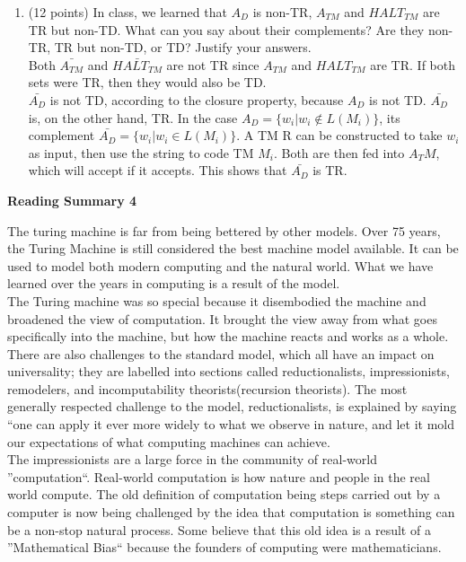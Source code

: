 \documentclass[11pt]{article}
\begin{document}
\begin{enumerate}
  \item (12 points) In class, we learned that $A_D$ is non-TR, $A_{TM}$ and $HALT_{TM}$ are TR but non-TD. What can you say 
	about their complements? Are they non-TR, TR but non-TD, or TD? Justify your answers. \\
	
	Both $\bar{A_{TM}}$ and $\bar{HALT_{TM}}$ are not TR since $A_{TM}$ and $HALT_{TM}$ are TR. If both sets were TR, then
	they would also be TD. \\
	$\bar{A_D}$ is not TD, according to the closure property, because $A_D$ is not TD. $\bar{A_D}$ is, on the other hand, TR.
	In the case $A_D = \{w_i | w_i \notin L(M_i) \}$, its complement $\bar{A_D} = \{w_i | w_i \in L(M_i) \}$. A TM R can be
	constructed to take $w_i$ as input, then use the string to code TM $M_i$. Both are then fed into $A_TM$, which will accept
	if it accepts. This shows that $\bar{A_D}$ is TR.
\end{enumerate}

\pagebreak
\setlength{\parindent}{1cm}
\centerline{\bf Reading Summary 4}

\begin{spacing}{1.5}
 \indent The turing machine is far from being bettered by other models. Over 75 years, the Turing Machine is still considered the best machine
 model available. It can be used to model both modern computing and the natural world. What we have learned over the years in computing is a
 result of the model. \\
 \indent The Turing machine was so special because it disembodied the machine and broadened the view of computation. It brought the view away
 from what goes specifically into the machine, but how the machine reacts and works as a whole. There are also challenges to the standard model,
 which all have an impact on universality; they are labelled into sections called reductionalists, impressionists, remodelers, and incomputability
 theorists(recursion theorists). The most generally respected challenge to the model, reductionalists, is explained by saying ``one can apply 
 it ever more widely to what we observe in nature, and let it mold our expectations of what computing machines can achieve. \\
 \indent The impressionists are a large force in the community of real-world ''computation``. Real-world computation is how nature and people in
 the real world compute. The old definition of computation being steps carried out by a computer is now being challenged by the idea that computation
 is something can be a non-stop natural process. Some believe that this old idea is a result of a ''Mathematical Bias`` because the founders of
 computing were mathematicians. 
\end{spacing}
\end{document}

